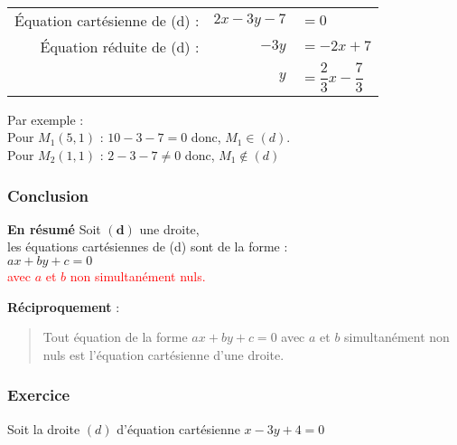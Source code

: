 \vspace{.5cm}

{\renewcommand{\arraystretch }{1.75}
\begin{tabular}{rrl}
	Équation cartésienne de (d) : & $  2x-3y-7 $ & $ = 0 $ \\
	Équation réduite de (d) :     & $ -3y      $ & $ = -2x +7 $\\
                                      & $   y      $ & $ = \dfrac{2}{3}x -\dfrac{7}{3}$ \\
\end{tabular}}
\renewcommand{\arraystretch }{1}



\vspace{.5cm}

Par exemple : \\

Pour  $M_{1}(5,1)$ : $10 -3 -7 = 0 $ 
donc, $M_{1} \in (d)$. \\

Pour  $M_{2}(1,1)$ : $2-3-7\neq 0$
donc, $M_{1} \notin (d)$

\newpage

\subsubsection{Conclusion}

\textbf{En résumé} Soit $\mathbf{ (d) }$ une droite,\\

les équations cartésiennes de (d) sont de la forme :\\
            $ax+by+c=0$ \\
           \textcolor{red}{avec $a$ et $b$ non simultanément nuls.
	  } 

\vspace{.5cm}

{\bf Réciproquement} : \begin{quote}
    Tout équation de la forme $ax+by+c=0$ avec $a$ et $b$ simultanément non nuls est l'équation cartésienne d'une droite.
\end{quote} 

\subsubsection{Exercice }

Soit la droite $(d)$ d'équation cartésienne $ x-3y+4=0$ \\

